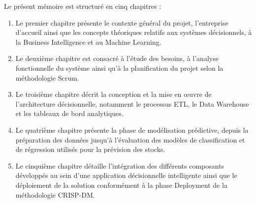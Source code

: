 Le présent mémoire est structuré en cinq chapitres :

\begin{enumerate}
    \item Le premier chapitre présente le contexte général du projet, l'entreprise d'accueil ainsi que les concepts théoriques relatifs aux systèmes décisionnels, à la Business Intelligence et au Machine Learning.
    \item Le deuxième chapitre est consacré à l'étude des besoins, à l'analyse fonctionnelle du système ainsi qu'à la planification du projet selon la méthodologie Scrum.
    \item Le troisième chapitre décrit la conception et la mise en œuvre de l'architecture décisionnelle, notamment le processus ETL, le Data Warehouse et les tableaux de bord analytiques.
    \item Le quatrième chapitre présente la phase de modélisation prédictive, depuis la préparation des données jusqu'à l'évaluation des modèles de classification et de régression utilisés pour la prévision des stocks.
    \item Le cinquième chapitre détaille l'intégration des différents composants développés au sein d'une application décisionnelle intelligente ainsi que le déploiement de la solution conformément à la phase Deployment de la méthodologie CRISP-DM.
\end{enumerate}
